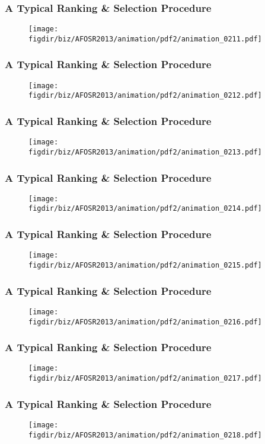 \documentclass[13pt]{beamer}
\newcommand{\figdir}{../../fig}
\begin{document}
\begin{frame}\frametitle{A Typical Ranking \& Selection Procedure}\begin{figure}\texttt{[image: \\figdir/biz/AFOSR2013/animation/pdf2/animation\_0211.pdf]}\end{figure}\end{frame}
\begin{frame}\frametitle{A Typical Ranking \& Selection Procedure}\begin{figure}\texttt{[image: \\figdir/biz/AFOSR2013/animation/pdf2/animation\_0212.pdf]}\end{figure}\end{frame}
\begin{frame}\frametitle{A Typical Ranking \& Selection Procedure}\begin{figure}\texttt{[image: \\figdir/biz/AFOSR2013/animation/pdf2/animation\_0213.pdf]}\end{figure}\end{frame}
\begin{frame}\frametitle{A Typical Ranking \& Selection Procedure}\begin{figure}\texttt{[image: \\figdir/biz/AFOSR2013/animation/pdf2/animation\_0214.pdf]}\end{figure}\end{frame}
\begin{frame}\frametitle{A Typical Ranking \& Selection Procedure}\begin{figure}\texttt{[image: \\figdir/biz/AFOSR2013/animation/pdf2/animation\_0215.pdf]}\end{figure}\end{frame}
\begin{frame}\frametitle{A Typical Ranking \& Selection Procedure}\begin{figure}\texttt{[image: \\figdir/biz/AFOSR2013/animation/pdf2/animation\_0216.pdf]}\end{figure}\end{frame}
\begin{frame}\frametitle{A Typical Ranking \& Selection Procedure}\begin{figure}\texttt{[image: \\figdir/biz/AFOSR2013/animation/pdf2/animation\_0217.pdf]}\end{figure}\end{frame}
\begin{frame}\frametitle{A Typical Ranking \& Selection Procedure}\begin{figure}\texttt{[image: \\figdir/biz/AFOSR2013/animation/pdf2/animation\_0218.pdf]}\end{figure}\end{frame}
\end{document}
